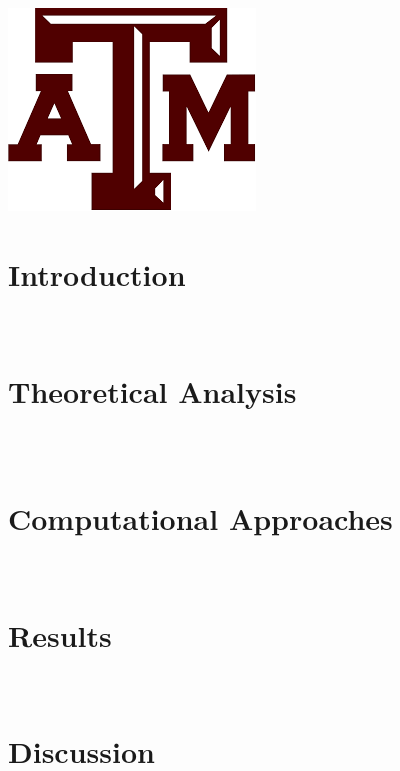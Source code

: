 \documentclass[11pt]{article}
\begin{document}
\begin{titlepage}

\includegraphics[scale=.3]{tamulogo.png}\\[1cm] 
 

\vfill 

\end{titlepage}

\tableofcontents
\newpage
\newpage

\section{Introduction}
$ $ \indent 





\section{Theoretical Analysis}
\subsection{}$ $
\indent 


\section{Computational Approaches}$ $

\indent

\section{Results}$ $

\indent

\section{Discussion}$ $
\end{document}
